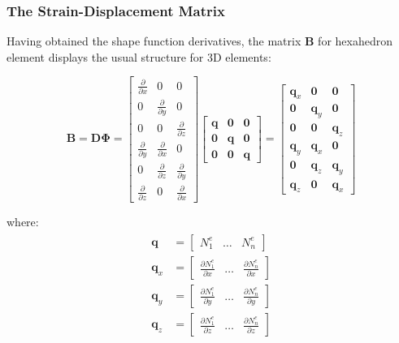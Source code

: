 \documentclass[10pt,b5paper,titlepage]{book}
\newenvironment{eqarray}
{
    \begin{eqnarray}
        \begin{aligned}
}
{
        \end{aligned}
    \end{eqnarray}
}
\begin{document}
\subsubsection{The Strain-Displacement Matrix}

Having obtained the shape function derivatives, the matrix $ \mathbf{B} $ for hexahedron
element displays the usual structure for 3D elements:

\begin{equation}
    \mathbf{B} = \mathbf{D}\mathbf{\Phi} =
    \begin{bmatrix}
        \frac{\partial}{\partial x} & 0 & 0 \\
        0 & \frac{\partial}{\partial y} & 0 \\
        0 & 0 & \frac{\partial}{\partial z} \\
        \frac{\partial}{\partial y} & \frac{\partial}{\partial x} & 0 \\
        0 & \frac{\partial}{\partial z} & \frac{\partial}{\partial y} \\
        \frac{\partial}{\partial z} & 0 & \frac{\partial}{\partial x}
    \end{bmatrix}
    \begin{bmatrix}
        \mathbf{q} & \mathbf{0} & \mathbf{0} \\
        \mathbf{0} & \mathbf{q} & \mathbf{0} \\
        \mathbf{0} & \mathbf{0} & \mathbf{q}
    \end{bmatrix} =
    \begin{bmatrix}
        \mathbf{q}_x & \mathbf{0} & \mathbf{0} \\
        \mathbf{0} & \mathbf{q}_y & \mathbf{0} \\
        \mathbf{0} & \mathbf{0} & \mathbf{q}_z \\
        \mathbf{q}_y & \mathbf{q}_x & \mathbf{0} \\
        \mathbf{0} & \mathbf{q}_z & \mathbf{q}_y \\
        \mathbf{q}_z & \mathbf{0} & \mathbf{q}_x
    \end{bmatrix}
\end{equation}

where:
\begin{eqarray}
    \mathbf{q} &= \begin{bmatrix} N_1^e & \dots & N_n^e \end{bmatrix}\\
    \mathbf{q}_x &= \begin{bmatrix} \frac{\partial N_1^e}{\partial x} & \dots & \frac{\partial N_n^e}{\partial x} \end{bmatrix}\\
    \mathbf{q}_y &= \begin{bmatrix} \frac{\partial N_1^e}{\partial y} & \dots & \frac{\partial N_n^e}{\partial y} \end{bmatrix}\\
    \mathbf{q}_z &= \begin{bmatrix} \frac{\partial N_1^e}{\partial z} & \dots & \frac{\partial N_n^e}{\partial z} \end{bmatrix}
\end{eqarray}
\end{document}

